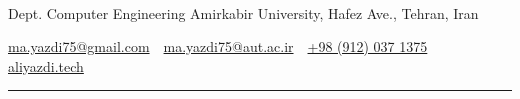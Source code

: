 \documentclass[letterpaper,MMMyyyy,nonstopmode]{resume}
\newcommand{\CVAuthor}{Ali Yazdi}
\newcommand{\CVWebpageName}{aliyazdi.tech}
\newcommand{\CVWebpage}{https://aliyazdi.tech/}
\begin{document}

\Title{\CVAuthor}

\begin{SubTitle}
\normalsize{
\href{https://www.linkedin.com/in/aliyazdi75}
{\faLinkedin}
\,\SubBulletSymbol\,
\href{https://github.com/aliyazdi75}
{\faGithub}
\,\SubBulletSymbol\,
\href{https://twitter.com/aliyazdi75}
{\faTwitter}
\,\SubBulletSymbol\,
\href{https://join.skype.com/invite/h3jUqpJH9jLh}
{\faSkype}
\,\SubBulletSymbol\,
\href{https://t.me/aliyazdi75}
{\faTelegram}
\,\SubBulletSymbol\,
\href{https://www.instagram.com/aliyazdi75/}
{\faInstagram}
\,\SubBulletSymbol\,
\href{mailto:ma.yazdi75@gmail.com}
{\faEnvelope}
\,\SubBulletSymbol\,
\href{tel:+989120371375}
{\faPhone}
\,\SubBulletSymbol\,
\href{\CVWebpage}
{\faGlobe}
}
\par
Dept. Computer Engineering Amirkabir University, Hafez Ave., Tehran, Iran
\par
\href{mailto:ma.yazdi75@gmail.com}
{ma.yazdi75@gmail.com}
\,\SubBulletSymbol\,
\href{mailto:ma.yazdi75@aut.ac.ir}
{ma.yazdi75@aut.ac.ir}
\,\SubBulletSymbol\,
\href{tel:+989120371375}
{+98 (912) 037 1375}
\,\SubBulletSymbol\,
\href{\CVWebpage}
{\CVWebpageName}
\end{SubTitle}

\smallskip\hrule
\end{document}

